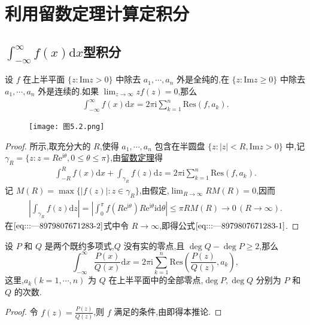 \documentclass[../../main.tex]{subfiles}
\begin{document}
\section{利用留数定理计算定积分}

\subsection{$\int_{-\infty}^{\infty}{f\left( x \right) \mathrm{d}x}$型积分}

\begin{theorem}\label{theorem:定理5.5.1}
设 \( f \) 在上半平面 \( \{ z: \mathrm{Im}z > 0 \} \) 中除去 \( a_1, \cdots, a_n \) 外是全纯的,在 \( \{ z: \mathrm{Im}z \geqslant 0 \} \) 中除去 \( a_1, \cdots, a_n \) 外是连续的.如果 \( \lim_{z \to \infty} z f(z) = 0 \),那么
\begin{align}
\int_{-\infty}^{\infty} f(x) \mathrm{d}x = 2\pi \mathrm{i} \sum_{k = 1}^{n} \mathrm{Res}(f, a_k). \label{eq:::---8979807671283-1}
\end{align}
\end{theorem}
\begin{figure}[H]
\centering
\texttt{[image: 图5.2.png]}
\caption{}
\label{figure:图5.2}
\end{figure}
\begin{proof}
所示,取充分大的 \( R \),使得 \( a_1, \cdots, a_n \) 包含在半圆盘 \( \{ z: |z| < R, \mathrm{Im}z > 0 \} \) 中,记 \( \gamma_R = \{ z: z = R\mathrm{e}^{\mathrm{i}\theta}, 0 \leqslant \theta \leqslant \pi \} \),由\hyperref[theorem:留数定理(残数定理)-定理5.4.9]{留数定理}得
\begin{align}
\int_{-R}^{R} f(x) \mathrm{d}x + \int_{\gamma_R} f(z) \mathrm{d}z = 2\pi \mathrm{i} \sum_{k = 1}^{n} \mathrm{Res}(f, a_k).\label{eq:::---8979807671283-2}
\end{align}
记 \( M(R) = \max \{ |f(z)| : z \in \gamma_R \} \),由假定,\( \lim_{R \to \infty} R M(R) = 0 \),因而
\begin{align*}
\left| \int_{\gamma_R} f(z) \mathrm{d}z \right| = \left| \int_{0}^{\pi} f(R\mathrm{e}^{\mathrm{i}\theta}) R\mathrm{e}^{\mathrm{i}\theta} \mathrm{i} \mathrm{d}\theta \right| \leqslant \pi R M(R) \to 0 \, (R \to \infty).
\end{align*}
在\(\eqref{eq:::---8979807671283-2}\)式中令 \( R \to \infty \),即得公式\(\eqref{eq:::---8979807671283-1}\).
\end{proof}

\begin{corollary}\label{corollary:推论5.5.2}
设 \( P \) 和 \( Q \) 是两个既约多项式,\( Q \) 没有实的零点,且 \( \deg Q - \deg P \geqslant 2 \),那么
\[
\int_{-\infty}^{\infty} \frac{P(x)}{Q(x)} \mathrm{d}x = 2\pi \mathrm{i} \sum_{k = 1}^{n} \mathrm{Res}\left( \frac{P(z)}{Q(z)}, a_k \right),
\]
这里,\( a_k (k = 1, \cdots, n) \) 为 \( Q \) 在上半平面中的全部零点,\( \deg P, \deg Q \) 分别为 \( P \) 和 \( Q \) 的次数.
\end{corollary}
\begin{proof}
令 \( f(z) = \frac{P(z)}{Q(z)} \),则 \( f \) 满足的条件,由即得本推论.
\end{proof}
\end{document}
